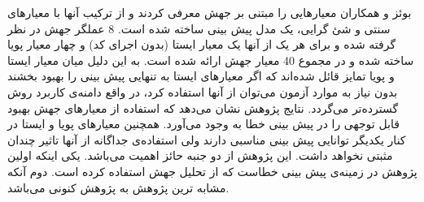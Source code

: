  بوئز و همکاران معیارهایی را مبتنی بر جهش معرفی کردند و  از ترکیب آنها با معیارهای سنتی و شئ گرایی، یک مدل پیش بینی ساخته شده است\cite{bowes2016mutation}. 8 عملگر جهش در نظر گرفته شده و برای هر یک از آنها یک معیار ایستا (بدون اجرای کد) و چهار معیار پویا ساخته شده و در مجموع 40 معیار جهش ارائه شده است. به این دلیل میان معیار ایستا و پویا تمایز قائل شده‌اند که اگر معیارهای ایستا به تنهایی  پیش بینی را بهبود بخشند بدون نیاز به موارد آزمون می‌توان از آنها استفاده کرد، در واقع دامنه‌ی کاربرد روش گسترده‌تر می‌گردد. نتایج پژوهش نشان می‌دهد که استفاده از معیارهای جهش بهبود قابل توجهی را در پیش بینی خطا به وجود می‌آورد. همچنین معیارهای پویا و ایستا در کنار یکدیگر توانایی پیش بینی مناسبی دارند ولی استفاده‌ی جداگانه از آنها تاثیر چندان مثبتی نخواهد داشت. این پژوهش از دو جنبه حائز اهمیت می‌باشد. یکی اینکه اولین پژوهش در زمینه‌ی پیش بینی خطاست که از تحلیل جهش استفاده کرده است. دوم آنکه مشابه ترین پژوهش به پژوهش کنونی می‌باشد. 
 
 
 
 
 
 
 
 
 
 
 
 
 
 
 
 
 
 
 
 
 


